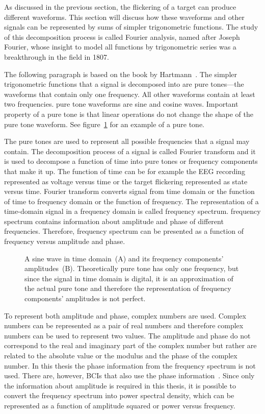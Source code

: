As discussed in the previous section, the \gls{flickering} of a \gls{target} can produce different waveforms. This section will discuss how these waveforms and other signals can be represented by sums of simpler trigonometric functions. The study of this decomposition process is called Fourier analysis, named after Joseph Fourier, whose insight to model all functions by trigonometric series was a breakthrough in the field in 1807.

The following paragraph is based on the book by Hartmann~\cite{pure_tone}. The simpler trigonometric functions that a signal is decomposed into are \glspl{pure tone}---the waveforms that contain only one frequency. All other waveforms contain at least two frequencies. \Gls{pure tone} waveforms are sine and cosine waves. Important property of a \gls{pure tone} is that linear operations do not change the shape of the \gls{pure tone} waveform. See figure~\ref{fig:pure_tone} for an example of a \gls{pure tone}.

The \glspl{pure tone} are used to represent all possible frequencies that a signal may contain. The decomposition process of a signal is called \gls{Fourier transform} and it is used to decompose a function of time into \glspl{pure tone} or \glspl{frequency component} that make it up. The function of time can be for example the \gls{EEG} recording represented as voltage versus time or the \gls{target} \gls{flickering} represented as \gls{state} versus time. \Gls{Fourier transform} converts signal from time domain or the function of time to frequency domain or the function of frequency. The representation of a time-domain signal in a frequency domain is called \gls{frequency spectrum}. \Gls{frequency spectrum} contains information about amplitude and phase of different frequencies. Therefore, \gls{frequency spectrum} can be presented as a function of frequency versus amplitude and phase.

\begin{figure}[h]
	
	\caption{A sine wave in time domain~(A) and its frequency components' amplitudes~(B). Theoretically pure tone has only one frequency, but since the signal in time domain is digital, it is an approximation of the actual pure tone and therefore the representation of frequency components' amplitudes is not perfect.}
	\label{fig:pure_tone}
\end{figure}

To represent both amplitude and phase, complex numbers are used. Complex numbers can be represented as a pair of real numbers and therefore complex numbers can be used to represent two values. The amplitude and phase do not correspond to the real and imaginary part of the complex number but rather are related to the absolute value or the modulus and the phase of the complex number. In this thesis the phase information from the \gls{frequency spectrum} is not used. There are, however, \glspl{BCI} that also use the phase information~\cite{MPCC}. Since only the information about amplitude is required in this thesis, it is possible to convert the \gls{frequency spectrum} into \gls{power spectral density}, which can be represented as a function of amplitude squared or power versus frequency.

